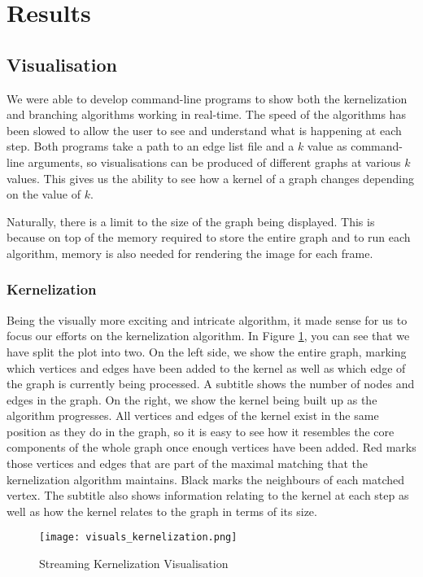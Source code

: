 \section{Results}

\subsection{Visualisation}

We were able to develop command-line programs to show both the kernelization
and branching algorithms working in real-time. The speed of the algorithms has
been slowed to allow the user to see and understand what is happening at each
step. Both programs take a path to an edge list file and a \(k\) value as
command-line arguments, so visualisations can be produced of different graphs
at various \(k\) values. This gives us the ability to see how a kernel of a
graph changes depending on the value of \(k\).

Naturally, there is a limit to the size of the graph being displayed. This is
because on top of the memory required to store the entire graph and to run each
algorithm, memory is also needed for rendering the image for each frame.

\subsubsection{Kernelization}

Being the visually more exciting and intricate algorithm, it made sense for us
to focus our efforts on the kernelization algorithm. In Figure
\ref{fig:kernelization_visualisation}, you can see that we have split the plot
into two. On the left side, we show the entire graph, marking which vertices
and edges have been added to the kernel as well as which edge of the graph is
currently being processed. A subtitle shows the number of nodes and edges in
the graph. On the right, we show the kernel being built up as the algorithm
progresses. All vertices and edges of the kernel exist in the same position as
they do in the graph, so it is easy to see how it resembles the core components
of the whole graph once enough vertices have been added. Red marks those
vertices and edges that are part of the maximal matching that the kernelization
algorithm maintains. Black marks the neighbours of each matched vertex. The
subtitle also shows information relating to the kernel at each step as well as
how the kernel relates to the graph in terms of its size.

\begin{figure}[htb]
    \centering
    \texttt{[image: visuals\_kernelization.png]}
    \caption{Streaming Kernelization Visualisation}
    \label{fig:kernelization_visualisation}
\end{figure}


